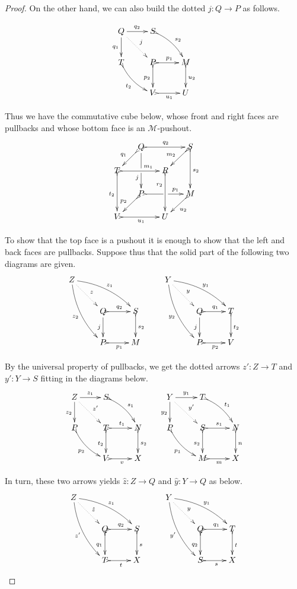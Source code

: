 \begin{proof}
On the other hand, we can also build the dotted $j\colon Q\to P$ as follows.

		\[\xymatrix{Q \ar[r]^{q_2} \ar[d]_{q_1} \ar@{.>}[dr]^{j}& S \ar@{>->}@/^.2cm/[dr]^{s_2}\\ T \ar@{>->}@/_.2cm/[dr]_{t_2}&P \ar@{>->}[r]^{p_1} \ar@{>->}[d]_{p_2} & M\ar@{>->}[d]^{u_2}  \\ &V \ar@{>->}[r]_{u_1} & U }\]
	
	Thus we have the commutative cube below, whose front and right faces are pullbacks and whose bottom face is an $\mathcal{M}$-pushout.
		\[\xymatrix@C=15pt@R=15pt{&Q\ar[dd]|\hole_(.65){j}\ar@{>->}[rr]^{q_2} \ar@{>->}[dl]_{q_1} && S \ar@{>->}[dd]^{s_2} \ar@{>->}[dl]_{m_2}\\ T \ar@{>->}[dd]_{t_2}\ar@{>->}[rr]^(.65){m_1} & & R \ar@{>->}[dd]_(.3){r_2}\\&P\ar@{>->}[rr]|\hole^(.7){p_1} \ar@{>->}[dl]_{p_2} && M \ar@{>->}[dl]^{u_2} \\V \ar@{>->}[rr]_{u_1} & & U}\]
		
		To show that the top face is a pushout it is enough to show that the left and back faces are pullbacks. Suppose thus that the solid part of the following two diagrams are given.
		\[\xymatrix{Z \ar@{.>}[dr]^{z} \ar@/^.3cm/[drr]^{z_1} \ar@/_.3cm/[ddr]_{z_2}&& &Y \ar@{.>}[dr]^{y} \ar@/^.3cm/[drr]^{y_1} \ar@/_.3cm/[ddr]_{y_2}\\&Q \ar@{>->}[r]^{q_2} \ar[d]_j & S \ar@{>->}[d]^{s_2}& &Q \ar@{>->}[r]^{q_1} \ar[d]_{j} & T \ar@{>->}[d]^{t_2}\\& P \ar@{>->}[r]_{p_1} & M && P \ar@{>->}[r]_{p_2}& V}\]
		
		By the universal property of pullbacks, we get the dotted arrows $z'\colon Z\to T$ and $y'\colon Y\to S$ fitting in the diagrams below.
		\[\xymatrix{Z \ar@{.>}[dr]^{z'} \ar[r]^{z_1} \ar[d]_{z_2}& S \ar@{>->}@/^.2cm/[dr]^{s_1}& &Y \ar@{.>}[dr]^{y'} \ar[r]^{y_1} \ar[d]_{y_2} & T  \ar@{>->}@/^.2cm/[dr]^{t_1}\\P \ar@{>->}@/_.2cm/[dr]_{p_2}&T \ar@{>->}[r]^{t_1} \ar@{>->}[d]_{t_2} & N \ar@{>->}[d]^{s_2}& P\ar@{>->}@/_.2cm/[dr]_{p_1}&S \ar@{>->}[r]^{s_1} \ar@{>->}[d]_{s_2} & N \ar@{>->}[d]^{n}\\& V \ar@{>->}[r]_{v} & X && M \ar@{>->}[r]_{m}& X}\]
		
		In turn, these two arrows yields $\hat{z}\colon Z \to Q$ and $\hat{y}\colon Y \to Q$ as below.
				\[\xymatrix{Z \ar@{.>}[dr]^{\hat{z}} \ar@/^.3cm/[drr]^{z_1} \ar@/_.3cm/[ddr]_{z'}&& &Y \ar@{.>}[dr]^{y} \ar@/^.3cm/[drr]^{y_1} \ar@/_.3cm/[ddr]_{y'}\\&Q \ar@{>->}[r]^{q_2} \ar@{>->}[d]_{q_1} & S \ar@{>->}[d]^{s}& &Q \ar@{>->}[r]^{q_1} \ar@{>->}[d]_{q_2} & T \ar@{>->}[d]^{t}\\& T \ar@{>->}[r]_{t} & X && S \ar@{>->}[r]_{s}& X}\]
	

\end{proof}
